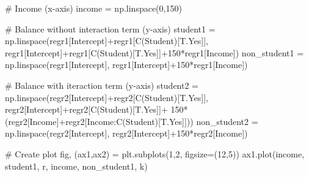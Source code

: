 \documentclass[
  letterpaper,
  DIV=11,
  numbers=noendperiod]{scrreprt}
\newenvironment{Shaded}{\begin{snugshade}}{\end{snugshade}}
\newcommand{\CommentTok}[1]{\textcolor[rgb]{0.37,0.37,0.37}{#1}}
\newcommand{\DecValTok}[1]{\textcolor[rgb]{0.68,0.00,0.00}{#1}}
\newcommand{\NormalTok}[1]{\textcolor[rgb]{0.00,0.23,0.31}{#1}}
\newcommand{\OperatorTok}[1]{\textcolor[rgb]{0.37,0.37,0.37}{#1}}
\newcommand{\StringTok}[1]{\textcolor[rgb]{0.13,0.47,0.30}{#1}}
\begin{document}
\begin{Shaded}
\begin{Highlighting}[]
\CommentTok{\# Income (x{-}axis)}
\NormalTok{income }\OperatorTok{=}\NormalTok{ np.linspace(}\DecValTok{0}\NormalTok{,}\DecValTok{150}\NormalTok{)}

\CommentTok{\# Balance without interaction term (y{-}axis)}
\NormalTok{student1 }\OperatorTok{=}\NormalTok{ np.linspace(regr1[}\StringTok{\textquotesingle{}Intercept\textquotesingle{}}\NormalTok{]}\OperatorTok{+}\NormalTok{regr1[}\StringTok{\textquotesingle{}C(Student)[T.Yes]\textquotesingle{}}\NormalTok{],}
\NormalTok{                       regr1[}\StringTok{\textquotesingle{}Intercept\textquotesingle{}}\NormalTok{]}\OperatorTok{+}\NormalTok{regr1[}\StringTok{\textquotesingle{}C(Student)[T.Yes]\textquotesingle{}}\NormalTok{]}\OperatorTok{+}\DecValTok{150}\OperatorTok{*}\NormalTok{regr1[}\StringTok{\textquotesingle{}Income\textquotesingle{}}\NormalTok{])}
\NormalTok{non\_student1 }\OperatorTok{=}\NormalTok{  np.linspace(regr1[}\StringTok{\textquotesingle{}Intercept\textquotesingle{}}\NormalTok{], regr1[}\StringTok{\textquotesingle{}Intercept\textquotesingle{}}\NormalTok{]}\OperatorTok{+}\DecValTok{150}\OperatorTok{*}\NormalTok{regr1[}\StringTok{\textquotesingle{}Income\textquotesingle{}}\NormalTok{])}

\CommentTok{\# Balance with iteraction term (y{-}axis)}
\NormalTok{student2 }\OperatorTok{=}\NormalTok{ np.linspace(regr2[}\StringTok{\textquotesingle{}Intercept\textquotesingle{}}\NormalTok{]}\OperatorTok{+}\NormalTok{regr2[}\StringTok{\textquotesingle{}C(Student)[T.Yes]\textquotesingle{}}\NormalTok{],}
\NormalTok{                       regr2[}\StringTok{\textquotesingle{}Intercept\textquotesingle{}}\NormalTok{]}\OperatorTok{+}\NormalTok{regr2[}\StringTok{\textquotesingle{}C(Student)[T.Yes]\textquotesingle{}}\NormalTok{]}\OperatorTok{+}
                       \DecValTok{150}\OperatorTok{*}\NormalTok{(regr2[}\StringTok{\textquotesingle{}Income\textquotesingle{}}\NormalTok{]}\OperatorTok{+}\NormalTok{regr2[}\StringTok{\textquotesingle{}Income:C(Student)[T.Yes]\textquotesingle{}}\NormalTok{]))}
\NormalTok{non\_student2 }\OperatorTok{=}\NormalTok{  np.linspace(regr2[}\StringTok{\textquotesingle{}Intercept\textquotesingle{}}\NormalTok{], regr2[}\StringTok{\textquotesingle{}Intercept\textquotesingle{}}\NormalTok{]}\OperatorTok{+}\DecValTok{150}\OperatorTok{*}\NormalTok{regr2[}\StringTok{\textquotesingle{}Income\textquotesingle{}}\NormalTok{])}

\CommentTok{\# Create plot}
\NormalTok{fig, (ax1,ax2) }\OperatorTok{=}\NormalTok{ plt.subplots(}\DecValTok{1}\NormalTok{,}\DecValTok{2}\NormalTok{, figsize}\OperatorTok{=}\NormalTok{(}\DecValTok{12}\NormalTok{,}\DecValTok{5}\NormalTok{))}
\NormalTok{ax1.plot(income, student1, }\StringTok{\textquotesingle{}r\textquotesingle{}}\NormalTok{, income, non\_student1, }\StringTok{\textquotesingle{}k\textquotesingle{}}\NormalTok{)}


\end{Highlighting}
\end{Shaded}
\end{document}
